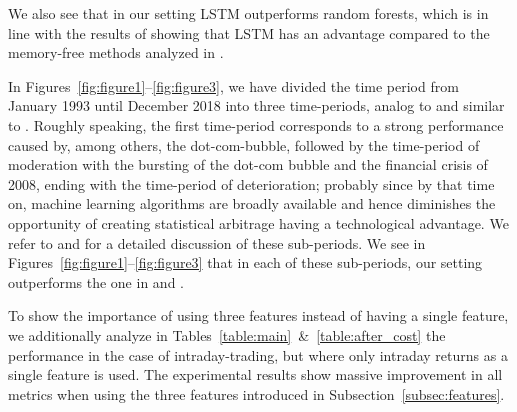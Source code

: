 \documentclass[review]{elsarticle}
\begin{document}
We also see that in our setting LSTM outperforms random forests, which is in line with the results of \cite{krauss18} showing that LSTM has an advantage compared to the  memory-free methods analyzed in \cite{krauss17}.

In Figures~\ref{fig:figure1}--\ref{fig:figure3}, we have divided the time period from January 1993 until December 2018 into three time-periods, analog to \cite{krauss18} and similar to \cite{krauss17}. Roughly speaking, the first time-period corresponds to a strong performance caused by, among others, the dot-com-bubble, followed by the time-period of moderation with the bursting of the dot-com bubble and the financial crisis of 2008, ending with the time-period of deterioration; probably since by that time on, machine learning algorithms are broadly available and hence diminishes the opportunity of creating statistical arbitrage having a technological advantage. We refer to \cite{krauss17} and \cite{krauss18} for a detailed discussion of these sub-periods. We see in Figures~\ref{fig:figure1}--\ref{fig:figure3} that in each of these sub-periods, our setting outperforms the one in \cite{krauss17} and \cite{krauss18}.


To show the importance of using three features instead of having a single feature, we additionally analyze in Tables~\ref{table:main}~\&~\ref{table:after_cost} the performance in the case of intraday-trading, but where only intraday returns  as a single feature is used.  
The experimental results show massive improvement in all metrics when using the three features introduced in Subsection~\ref{subsec:features}.
\end{document}
